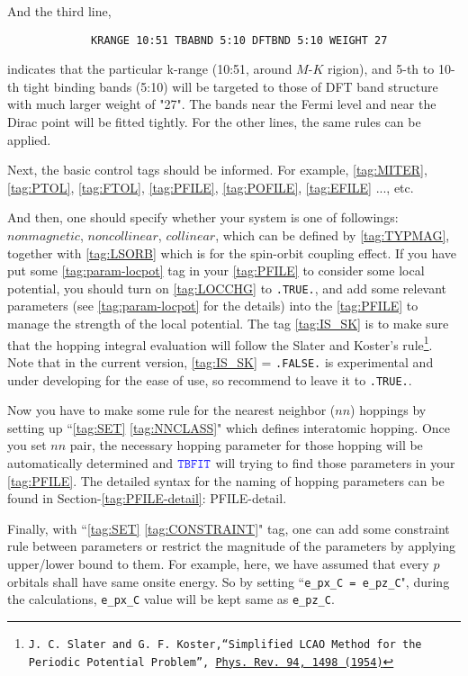\documentclass[a4paper,12pt]{scrartcl}
\newcommand{\tbfitname}{\textcolor{blue!85!white}{\texttt{TBFIT}}}
\begin{document}
			And the third line,
		    \begin{Verbatim}
             KRANGE 10:51 TBABND 5:10 DFTBND 5:10 WEIGHT 27
		    \end{Verbatim}
			indicates that the particular k-range (10:51, around $M$-$K$ rigion), and 5-th to 10-th tight binding bands (5:10) will be targeted to those of DFT band structure with much larger weight of "27". The bands near the Fermi level and near the Dirac point will be fitted tightly. For the other lines, the same rules can be applied. 
		
			Next, the basic control tags should be informed.
			For example, \ref{tag:MITER}, \ref{tag:PTOL}, \ref{tag:FTOL}, \ref{tag:PFILE}, \ref{tag:POFILE}, \ref{tag:EFILE} ..., etc.
			
			And then, one should specify whether your system is one of
			followings: $nonmagnetic$, $noncollinear$, $collinear$,
			which can be defined by \ref{tag:TYPMAG}, together with 
			\ref{tag:LSORB} which is for the spin-orbit coupling effect.
			If you have put some \ref{tag:param-locpot} tag in your \ref{tag:PFILE} to consider some local potential, you should turn on \ref{tag:LOCCHG} to \texttt{.TRUE.}, and add some relevant parameters (see \ref{tag:param-locpot} for the details) into the \ref{tag:PFILE} to manage the strength of the local potential. 
			The tag \ref{tag:IS_SK} is to make sure that the hopping integral evaluation will follow the Slater and Koster's rule\footnote{\texttt{J. C. Slater and G. F. Koster,``Simplified LCAO Method for the Periodic Potential Problem'',
		\href{https://journals.aps.org/pr/abstract/10.1103/PhysRev.94.1498}
		{Phys. Rev. 94, 1498 (1954)}}}. Note that in the current version, \ref{tag:IS_SK} = \texttt{.FALSE.} is experimental and under developing for the ease of use, so recommend to leave it to \texttt{.TRUE.}.
		
			Now you have to make some rule for the nearest neighbor ($nn$) hoppings by setting up ``\ref{tag:SET} \ref{tag:NNCLASS}" which defines interatomic hopping.
			Once you set $nn$ pair, the necessary hopping parameter for those hopping will be automatically determined and $\tbfitname$ will trying to find those parameters in your \ref{tag:PFILE}. The detailed syntax for the naming of hopping parameters can be found in Section-\ref{tag:PFILE-detail}: PFILE-detail. 
			
			Finally, with ``\ref{tag:SET} \ref{tag:CONSTRAINT}" tag, one can add some constraint rule between parameters or restrict the magnitude of the parameters by applying upper/lower bound to them. For example, here, we have assumed that every $p$ orbitals shall have same onsite energy. So by setting ``\texttt{e\_px\_C = e\_pz\_C}",  during the calculations, \texttt{e\_px\_C} value will be kept same as \texttt{e\_pz\_C}. 
			
\end{document}
